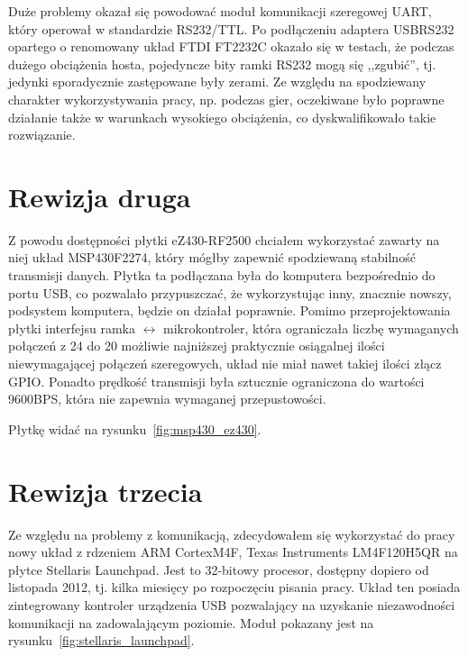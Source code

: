 Duże problemy okazał się powodować moduł komunikacji szeregowej UART, który operował w standardzie RS232/TTL.
Po podłączeniu adaptera USB\ppauza{}RS232 opartego o renomowany układ FTDI FT2232C okazało się w testach, że podczas dużego obciążenia hosta, pojedyncze bity ramki RS232 mogą się ,,zgubić'', tj. jedynki sporadycznie zastępowane były zerami.
Ze względu na spodziewany charakter wykorzystywania pracy, np. podczas gier, oczekiwane było poprawne działanie także w warunkach wysokiego obciążenia, co dyskwalifikowało takie rozwiązanie.\\

\section{Rewizja druga}

Z powodu dostępności płytki eZ430-RF2500 chciałem wykorzystać zawarty na niej układ MSP430F2274, który mógłby zapewnić spodziewaną stabilność transmisji danych.
Płytka ta podłączana była do komputera bezpośrednio do portu USB, co pozwalało przypuszczać, że wykorzystując inny, znacznie nowszy, podsystem komputera, będzie on działał poprawnie.
Pomimo przeprojektowania płytki interfejsu ramka $\leftrightarrow$ mikrokontroler, która ograniczała liczbę wymaganych połączeń z 24 do 20 \pauza możliwie najniższej praktycznie osiągalnej ilości niewymagającej połączeń szeregowych, układ nie miał nawet takiej ilości złącz GPIO.
Ponadto prędkość transmisji była sztucznie ograniczona do wartości 9600BPS, która nie zapewnia wymaganej przepustowości.

Płytkę widać na rysunku~\ref{fig:msp430_ez430}.\\

\section{Rewizja trzecia}

Ze względu na problemy z komunikacją, zdecydowałem się wykorzystać do pracy nowy układ z rdzeniem ARM Cortex\ppauza{}M4F, Texas Instruments LM4F120H5QR na płytce Stellaris Launchpad. Jest to 32-bitowy procesor, dostępny dopiero od listopada 2012, tj. kilka miesięcy po rozpoczęciu pisania pracy.
Układ ten posiada zintegrowany kontroler urządzenia USB pozwalający na uzyskanie niezawodności komunikacji na zadowalającym poziomie.
Moduł pokazany jest na rysunku~\ref{fig:stellaris_launchpad}.

